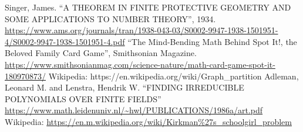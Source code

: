 \documentclass[11pt, oneside]{article} 	%
\begin{document}
\begin{thebibliography}{9}
 Singer, James. ``A THEOREM IN FINITE PROTECTIVE GEOMETRY AND SOME APPLICATIONS TO NUMBER THEORY'', 1934. \url{https://www.ams.org/journals/tran/1938-043-03/S0002-9947-1938-1501951-4/S0002-9947-1938-1501951-4.pdf} 
 ``The Mind-Bending Math Behind Spot It!, the Beloved Family Card Game'', Smithsonian Magazine. \url{https://www.smithsonianmag.com/science-nature/math-card-game-spot-it-180970873/}
 Wikipedia: {https://en.wikipedia.org/wiki/Graph\_partition}
 Adleman, Leonard M. and Lenstra, Hendrik W. ``FINDING IRREDUCIBLE POLYNOMIALS OVER FINITE FIELDS'' \url{https://www.math.leidenuniv.nl/~hwl/PUBLICATIONS/1986a/art.pdf}
 Wikipedia: \url{https://en.m.wikipedia.org/wiki/Kirkman\%27s_schoolgirl_problem}
\end{thebibliography}


\end{document}
